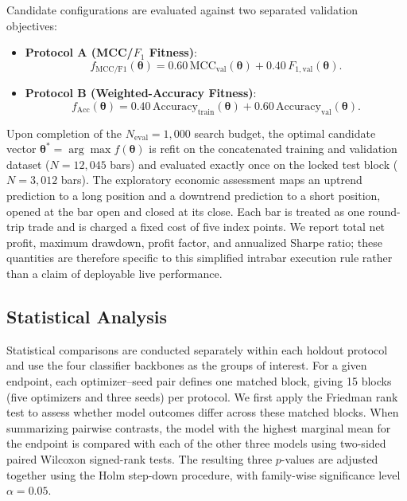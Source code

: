 Candidate configurations are evaluated against two separated validation objectives:
\begin{itemize}
    \item \textbf{Protocol A (MCC/$F_1$ Fitness)}:
    \begin{equation}\label{eq:fitness_protocol_a}
    f_{\mathrm{MCC/F1}}(\boldsymbol{\theta}) = 0.60\,\mathrm{MCC}_{\mathrm{val}}(\boldsymbol{\theta}) + 0.40\,F_{1,\mathrm{val}}(\boldsymbol{\theta}).
    \end{equation}
    \item \textbf{Protocol B (Weighted-Accuracy Fitness)}:
    \begin{equation}\label{eq:fitness_protocol_b}
    f_{\mathrm{Acc}}(\boldsymbol{\theta}) = 0.40\,\mathrm{Accuracy}_{\mathrm{train}}(\boldsymbol{\theta}) + 0.60\,\mathrm{Accuracy}_{\mathrm{val}}(\boldsymbol{\theta}).
    \end{equation}
\end{itemize}

Upon completion of the $N_{\mathrm{eval}} = 1{,}000$ search budget, the optimal candidate vector $\boldsymbol{\theta}^* = \arg\max f(\boldsymbol{\theta})$ is refit on the concatenated training and validation dataset ($N = 12{,}045$ bars) and evaluated exactly once on the locked test block ($N = 3{,}012$ bars). The exploratory economic assessment maps an uptrend prediction to a long position and a downtrend prediction to a short position, opened at the bar open and closed at its close. Each bar is treated as one round-trip trade and is charged a fixed cost of five index points. We report total net profit, maximum drawdown, profit factor, and annualized Sharpe ratio; these quantities are therefore specific to this simplified intrabar execution rule rather than a claim of deployable live performance.

\subsection{Statistical Analysis}
\label{sec:statistical_analysis}

Statistical comparisons are conducted separately within each holdout protocol and use the four classifier backbones as the groups of interest. For a given endpoint, each optimizer--seed pair defines one matched block, giving 15 blocks (five optimizers and three seeds) per protocol. We first apply the Friedman rank test to assess whether model outcomes differ across these matched blocks. When summarizing pairwise contrasts, the model with the highest marginal mean for the endpoint is compared with each of the other three models using two-sided paired Wilcoxon signed-rank tests. The resulting three $p$-values are adjusted together using the Holm step-down procedure, with family-wise significance level $\alpha=0.05$.

